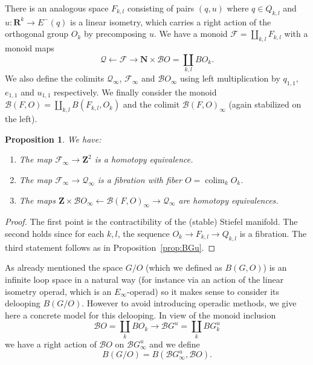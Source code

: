 \documentclass[reqno]{amsart}
\newcommand{\THOMAS}[1]%
	{\begin{quotation}{\footnotesize\textcolor{brown}{\textbf{Thomas:} #1}}\end{quotation}}
\newcommand{\Mohammed}[1]
       {\begin{quotation}{\footnotesize\textcolor{green}{\textbf{Mohammed:} #1}}\end{quotation} }
\theoremstyle{theorem}
\newtheorem{proposition}[corollary]{Proposition}
\theoremstyle{remark}
\theoremstyle{definition}
\DeclareMathOperator*{\colim}{colim}
\newcommand{\FF}{\mathcal{F}}
\newcommand{\R}{\mathbf{R}}
\newcommand{\B}{\mathcal{B}}
\newcommand{\Z}{\mathbf{Z}}
\newcommand{\N}{\mathbf{N}}
\newcommand{\QQ}{\mathcal{Q}}
\begin{document}
There is an analogous space $F_{k,l}$ consisting of pairs $(q,u)$ where $q\in Q_{k,l}$ and
$u : \R^k \to E^-(q)$ is a linear isometry, which carries a right action of the orthogonal group $O_k$
by precomposing $u$. We have a monoid $\FF=\coprod_{k,l} F_{k,l}$ with a monoid maps
\begin{equation*}
\QQ \leftarrow  \FF \to  \N\times\B O=\coprod_{k,l} BO_k.
\end{equation*}
We also define the colimits $\QQ_\infty$, $\FF_\infty$ and $\B O_\infty$ using
left multiplication by $q_{1,1}$, $e_{1,1}$ and $u_{1,1}$ respectively. We finally consider the monoid
$\B(F,O)=\coprod_{k,l} B(F_{k,l},O_k)$ and the colimit $\B(F,O)_\infty$ (again stabilized on the left).
\begin{proposition}\label{prop:BO}
We have:
\begin{enumerate}
\item The map $\FF_\infty \to \Z^2$ is a homotopy equivalence.
\item The map $\FF_\infty \to \QQ_\infty$ is a fibration with fiber $O=\colim_k O_k$.
\item The maps $\Z\times \B O_\infty \leftarrow\B(F, O)_\infty \rightarrow \QQ_\infty$ are homotopy equivalences.
\end{enumerate}
\end{proposition}
\begin{proof}
The first point is the contractibility of the (stable) Stiefel manifold. The second holds since for each $k,l$, the sequence $O_k \to F_{k,l} \to Q_{k,l}$ is a fibration. %
The third statement follows as in Proposition~\ref{prop:BGu}.
\end{proof}


As already mentioned the space $G/O$ (which we defined as $B(G,O)$) is an infinite loop space in a natural way (for instance via an action of the
linear isometry operad, which is an $E_\infty$-operad) so it makes sense to consider its delooping $B(G/O)$.
However to avoid introducing operadic methods, we give here a concrete model for this delooping. In view of the monoid inclusion 
\[\B O=\coprod_k BO_k \to \B G^u=\coprod_k B G^u_k\]
we have a right action of $\B O$ on $\B G^u_\infty$ and
we define
\begin{equation}\label{eq:B(G/O)}
B(G/O)=B(\B G^u_\infty, \B O).
\end{equation}
\end{document}
